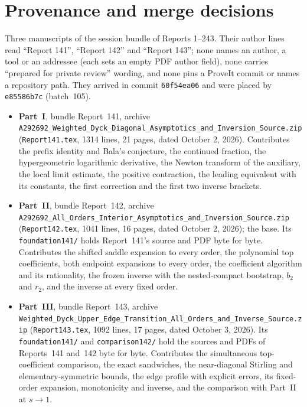 \documentclass[11pt,letterpaper]{article}
\theoremstyle{remark}\newtheorem{remark}[theorem]{Remark}
\newcommand{\file}[1]{\nolinkurl{#1}}
\begin{document}
\section*{Provenance and merge decisions}\label{wdn:sec:provenance}
Three manuscripts of the session bundle of Reports 1--243. Their author lines read ``Report 141'', ``Report 142'' and ``Report 143''; none names an author, a tool or an addressee (each sets an empty PDF author field), none carries ``prepared for private review'' wording, and none pins a ProveIt commit or names a repository path. They arrived in commit \texttt{60f54ea06} and were placed by \texttt{e85586b7c} (batch~105).
\begin{itemize}
\item \textbf{Part~I}, bundle Report~141, archive \file{A292692_Weighted_Dyck_Diagonal_Asymptotics_and_Inversion_Source.zip} (\file{Report141.tex}, 1314 lines, 21 pages, dated October 2, 2026). Contributes the prefix identity and Bala's conjecture, the continued fraction, the hypergeometric logarithmic derivative, the Newton transform of the auxiliary, the local limit estimate, the positive contraction, the leading equivalent with its constants, the first correction and the first two inverse brackets.
\item \textbf{Part~II}, bundle Report~142, archive \file{A292692_All_Orders_Interior_Asymptotics_and_Inversion_Source.zip} (\file{Report142.tex}, 1041 lines, 16 pages, dated October 2, 2026); the base. Its \file{foundation141/} holds Report~141's source and PDF byte for byte. Contributes the shifted saddle expansion to every order, the polynomial top coefficients, both endpoint expansions to every order, the coefficient algorithm and its rationality, the frozen inverse with the nested-compact bootstrap, $b_2$ and $r_2$, and the inverse at every fixed order.
\item \textbf{Part~III}, bundle Report~143, archive \file{Weighted_Dyck_Upper_Edge_Transition_All_Orders_and_Inverse_Source.zip} (\file{Report143.tex}, 1092 lines, 17 pages, dated October 3, 2026). Its \file{foundation141/} and \file{comparison142/} hold the sources and PDFs of Reports~141 and~142 byte for byte. Contributes the simultaneous top-coefficient comparison, the exact sandwiches, the near-diagonal Stirling and elementary-symmetric bounds, the edge profile with explicit errors, its fixed-order expansion, monotonicity and inverse, and the comparison with Part~II at $s\to1$.
\end{itemize}
\end{document}
